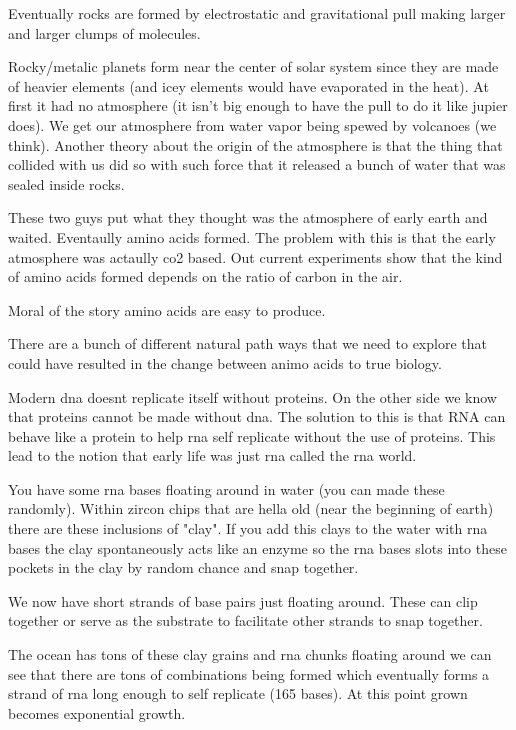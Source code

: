 \documentclass{article}
\begin{document}
Eventually rocks are formed by electrostatic and gravitational pull making larger and larger clumps of molecules.


Rocky/metalic planets form near the center of solar system since they are made of heavier elements (and icey elements would have evaporated in the heat). At first it had no atmosphere (it isn't big enough to have the pull to do it like jupier does). We get our atmosphere from water vapor being spewed by volcanoes (we think). Another theory about the origin of the atmosphere is that the thing that collided with us did so with such force that it released a bunch of water that was sealed inside rocks.



These two guys put what they thought was the atmosphere of early earth and waited. Eventaully amino acids formed. The problem with this is that the early atmosphere was actaully co2 based. Out current experiments show that the kind of amino acids formed depends on the ratio of carbon in the air.

Moral of the story amino acids are easy to produce.


There are a bunch of different natural path ways that we need to explore that could have resulted in the change between animo acids to true biology.


Modern dna doesnt replicate itself without proteins. On the other side we know that proteins cannot be made without dna. The solution to this is that RNA can behave like a protein to help rna self replicate without the use of proteins. This lead to the notion that early life was just rna called the rna world.


You have some rna bases floating around in water (you can made these randomly). Within zircon chips that are hella old (near the beginning of earth) there are these inclusions of "clay". If you add this clays to the water with rna bases the clay spontaneously acts like an enzyme so the rna bases slots into these pockets in the clay by random chance and snap together.


We now have short strands of base pairs just floating around. These can clip together or serve as the substrate to facilitate other strands to snap together.

The ocean has tons of these clay grains and rna chunks floating around we can see that there are tons of combinations being formed which eventually forms a strand of rna long enough to self replicate (165 bases). At this point grown becomes exponential growth.
\end{document}
